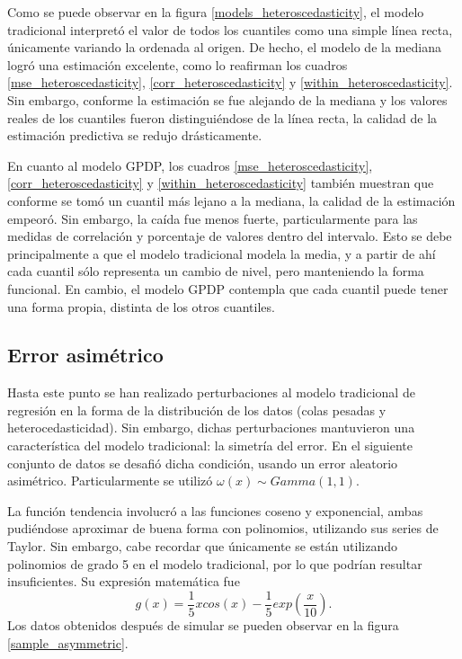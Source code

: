 Como se puede observar en la figura \ref{models_heteroscedasticity}, el modelo tradicional interpret\'o el valor de todos los cuantiles como una simple l\'inea recta, \'unicamente variando la ordenada al origen. De hecho, el modelo de la mediana logr\'o una estimaci\'on excelente, como lo reafirman los cuadros \ref{mse_heteroscedasticity}, \ref{corr_heteroscedasticity} y \ref{within_heteroscedasticity}. Sin embargo, conforme la estimaci\'on se fue alejando de la mediana y los valores reales de los cuantiles fueron distingui\'endose de la l\'inea recta, la calidad de la estimaci\'on predictiva se redujo dr\'asticamente.

En cuanto al modelo GPDP, los cuadros \ref{mse_heteroscedasticity}, \ref{corr_heteroscedasticity} y \ref{within_heteroscedasticity} tambi\'en muestran que conforme se tom\'o un cuantil m\'as lejano a la mediana, la calidad de la estimaci\'on empeor\'o. Sin embargo, la ca\'ida fue menos fuerte, particularmente para las medidas de correlaci\'on y porcentaje de valores dentro del intervalo. Esto se debe principalmente a que el modelo tradicional modela la media, y a partir de ah\'i cada cuantil s\'olo representa un cambio de nivel, pero manteniendo la forma funcional. En cambio, el modelo GPDP contempla que cada cuantil puede tener una forma propia, distinta de los otros cuantiles.

\subsection{Error asim\'etrico}

Hasta este punto se han realizado perturbaciones al modelo tradicional de regresi\'on en la forma de la distribuci\'on de los datos (colas pesadas y heterocedasticidad). Sin embargo, dichas perturbaciones mantuvieron una caracter\'istica del modelo tradicional: la simetr\'ia del error. En el siguiente conjunto de datos se desafi\'o dicha condici\'on, usando un error aleatorio asim\'etrico. Particularmente se utiliz\'o $\omega(x) \sim Gamma(1,1)$.

La funci\'on tendencia involucr\'o a las funciones coseno y exponencial, ambas pudi\'endose aproximar de buena forma con polinomios, utilizando sus series de Taylor. Sin embargo, cabe recordar que \'unicamente se est\'an utilizando polinomios de grado 5 en el modelo tradicional, por lo que podr\'ian resultar insuficientes. Su expresi\'on matem\'atica fue
\begin{equation*}
    g(x) = \frac{1}{5} x cos(x) - \frac{1}{5}exp\left(\frac{x}{10}\right).
\end{equation*}
Los datos obtenidos despu\'es de simular se pueden observar en la figura \ref{sample_asymmetric}.

